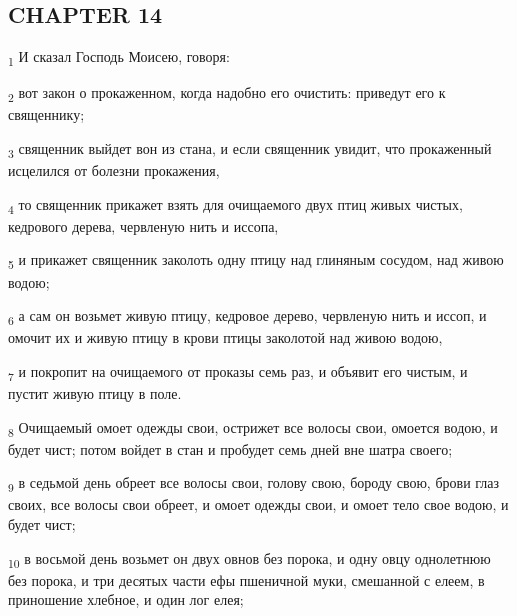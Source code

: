 \subsection{CHAPTER 14}
\begin{tcolorbox}
\textsubscript{1} И сказал Господь Моисею, говоря:
\end{tcolorbox}
\begin{tcolorbox}
\textsubscript{2} вот закон о прокаженном, когда надобно его очистить: приведут его к священнику;
\end{tcolorbox}
\begin{tcolorbox}
\textsubscript{3} священник выйдет вон из стана, и если священник увидит, что прокаженный исцелился от болезни прокажения,
\end{tcolorbox}
\begin{tcolorbox}
\textsubscript{4} то священник прикажет взять для очищаемого двух птиц живых чистых, кедрового дерева, червленую нить и иссопа,
\end{tcolorbox}
\begin{tcolorbox}
\textsubscript{5} и прикажет священник заколоть одну птицу над глиняным сосудом, над живою водою;
\end{tcolorbox}
\begin{tcolorbox}
\textsubscript{6} а сам он возьмет живую птицу, кедровое дерево, червленую нить и иссоп, и омочит их и живую птицу в крови птицы заколотой над живою водою,
\end{tcolorbox}
\begin{tcolorbox}
\textsubscript{7} и покропит на очищаемого от проказы семь раз, и объявит его чистым, и пустит живую птицу в поле.
\end{tcolorbox}
\begin{tcolorbox}
\textsubscript{8} Очищаемый омоет одежды свои, острижет все волосы свои, омоется водою, и будет чист; потом войдет в стан и пробудет семь дней вне шатра своего;
\end{tcolorbox}
\begin{tcolorbox}
\textsubscript{9} в седьмой день обреет все волосы свои, голову свою, бороду свою, брови глаз своих, все волосы свои обреет, и омоет одежды свои, и омоет тело свое водою, и будет чист;
\end{tcolorbox}
\begin{tcolorbox}
\textsubscript{10} в восьмой день возьмет он двух овнов без порока, и одну овцу однолетнюю без порока, и три десятых части ефы пшеничной муки, смешанной с елеем, в приношение хлебное, и один лог елея;
\end{tcolorbox}
